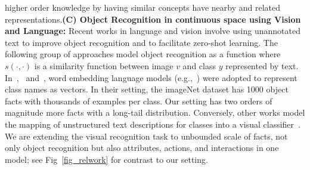 \documentclass[runningheads]{llncs}
\begin{document}
higher order knowledge by having similar concepts have nearby and related representations.\textbf{(C) Object Recognition in continuous space using Vision and Language:}
Recent works in language and vision involve using  unannotated text to improve object recognition and to facilitate zero-shot learning. The following group of  approaches model object recognition as a function
where $s(\cdot,\cdot)$ is a similarity function between image $v$ and class $y$ represented by text.
In~\cite{NIPS13DeViSE},~\cite{norouzi2014zero} and~\cite{NIPS13CMT},  word  embedding language models (e.g.,~\cite{mikolov2013distributed}) were adopted to represent class names as vectors.
In their setting, the imageNet dataset has 1000 object facts with thousands of examples per class.
Our setting has two orders of magnitude more facts with a long-tail distribution. Conversely, other works model the mapping of unstructured text descriptions for classes  into a visual classifier~\cite{elhoseiny2013write,ba2015predicting}. %
We are extending the visual recognition task to unbounded scale of facts,
not only object recognition but also attributes, actions, and interactions in one model;
see Fig~\ref{fig_relwork} for contrast to our setting. %
\end{document}
